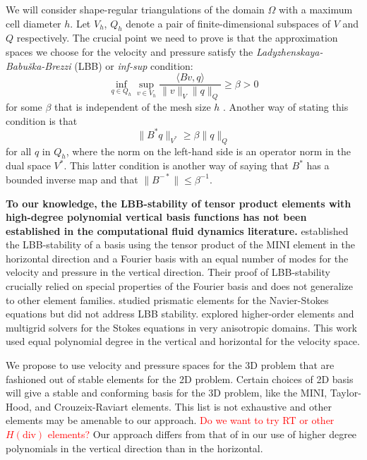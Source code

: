 \documentclass{article}
\theoremstyle{definition}
\theoremstyle{plain}
\begin{document}
We will consider shape-regular triangulations of the domain $\Omega$ with a maximum cell diameter $h$.
Let $V_h$, $Q_h$ denote a pair of finite-dimensional subspaces of $V$ and $Q$ respectively.
The crucial point we need to prove is that the approximation spaces we choose for the velocity and pressure satisfy the \emph{Ladyzhenskaya-Babu\v{s}ka-Brezzi} (LBB) or \emph{inf-sup} condition:
\begin{equation}
    \inf_{q\in Q_h}\sup_{v \in V_h}\frac{\langle Bv, q\rangle}{\|v\|_V\|q\|_Q} \ge \beta > 0
\end{equation}
for some $\beta$ that is independent of the mesh size $h$ \citep{boffi2013mixed}.
Another way of stating this condition is that
\begin{equation}
    \|B^*q\|_{V^*} \ge \beta\|q\|_Q
\end{equation}
for all $q$ in $Q_h$, where the norm on the left-hand side is an operator norm in the dual space $V^*$.
This latter condition is another way of saying that $B^*$ has a bounded inverse map and that $\|B^{-*}\| \le \beta^{-1}$.

\textbf{To our knowledge, the LBB-stability of tensor product elements with high-degree polynomial vertical basis functions has not been established in the computational fluid dynamics literature.}
\citet{canuto1984combined} established the LBB-stability of a basis using the tensor product of the MINI element in the horizontal direction and a Fourier basis with an equal number of modes for the velocity and pressure in the vertical direction.
Their proof of LBB-stability crucially relied on special properties of the Fourier basis and does not generalize to other element families.
\citet{nakahashi1989finite} studied prismatic elements for the Navier-Stokes equations but did not address LBB stability.
\citet{isaac2015solution} explored higher-order elements and multigrid solvers for the Stokes equations in very anisotropic domains.
This work used equal polynomial degree in the vertical and horizontal for the velocity space.

We propose to use velocity and pressure spaces for the 3D problem that are fashioned out of stable elements for the 2D problem.
Certain choices of 2D basis will give a stable and conforming basis for the 3D problem, like the MINI, Taylor-Hood, and Crouzeix-Raviart elements.
This list is not exhaustive and other elements may be amenable to our approach.
\textcolor{red}{Do we want to try RT or other $H(\text{div})$ elements?}
Our approach differs from that of \citet{isaac2015solution} in our use of higher degree polynomials in the vertical direction than in the horizontal.
\end{document}
